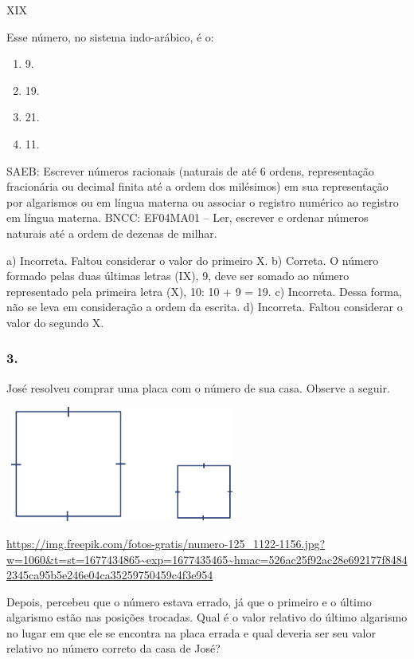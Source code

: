 \begin{enumerate}
XIX

Esse número, no sistema indo-arábico, é o:

\begin{enumerate}
\def\labelenumi{\alph{enumi})}
\item
  9.
\item
  19.
\item
  21.
\item
  11.
\end{enumerate}

SAEB: Escrever números racionais (naturais de até 6 ordens, representação fracionária ou decimal finita até a ordem dos milésimos) em sua representação por algarismos ou em língua materna ou associar o registro numérico ao registro em língua materna.
BNCC: EF04MA01 -- Ler, escrever e ordenar números naturais até a ordem de dezenas de milhar.

a)  Incorreta. Faltou considerar o valor do primeiro X.
b)  Correta. O número formado pelas duas últimas letras (IX), 9, deve ser somado ao número representado pela primeira letra (X), 10: 10 + 9 = 19.
c)  Incorreta. Dessa forma, não se leva em consideração a ordem da escrita.
d)  Incorreta. Faltou considerar o valor do segundo X.


\subsubsection{3.}\label{section-12}

José resolveu comprar uma placa com o número de sua casa. Observe a seguir.

\includegraphics[width=3.02500in,height=1.48973in]{media/image26.png}

\url{https://img.freepik.com/fotos-gratis/numero-125_1122-1156.jpg?w=1060\&t=st=1677434865~exp=1677435465~hmac=526ac25f92ac28e692177f84842345ca95b5e246e04ca35259750459c4f3e954}

Depois, percebeu que o número estava
errado, já que o primeiro e o último algarismo estão nas posições
trocadas. Qual é o valor relativo do último algarismo no lugar em que ele se
encontra na placa errada e qual deveria ser seu valor relativo no número
correto da casa de José?


\end{enumerate}
